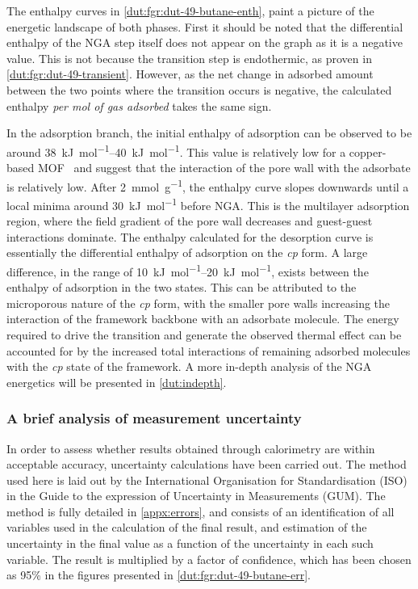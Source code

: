 The enthalpy curves in \autoref{dut:fgr:dut-49-butane-enth},
paint a picture of the energetic landscape of both phases.
First it should be noted that the differential enthalpy of
the NGA step itself does not appear on the graph as it is a
negative value. This is not because the transition step is 
endothermic, as proven in \autoref{dut:fgr:dut-49-transient}. 
However, as the net change in adsorbed amount between the two
points where the transition occurs is negative, the calculated
enthalpy \textit{per mol of gas adsorbed} takes the same sign.

In the adsorption branch, the initial enthalpy of adsorption 
can be observed to be around \SIrange{38}{40}{\kilo\joule\per\mol}.
This value is relatively low for a copper-based 
MOF~\cite{langeStructuralFlexibilityCopperbased2014} and suggest
that the interaction of the pore wall with the adsorbate is 
relatively low. After \SI{2}{\milli\mol\per\gram}, the enthalpy
curve slopes downwards until a local minima around 
\SI{30}{\kilo\joule\per\mol} before NGA. 
This is the multilayer adsorption region,
where the field gradient of the pore wall decreases and guest-guest 
interactions dominate.
The enthalpy calculated for the desorption curve is essentially the 
differential enthalpy of adsorption on the \textit{cp} form. A large 
difference, in the range of \SIrange{10}{20}{\kilo\joule\per\mol}, exists
between the enthalpy of adsorption in the two states. This can be 
attributed to the microporous nature of the \textit{cp} form, with the
smaller pore walls increasing the interaction of the framework backbone
with an adsorbate molecule. The energy required to drive the 
transition and generate the observed thermal effect can be accounted 
for by the increased total interactions of remaining adsorbed 
molecules with the \textit{cp} state of the framework.
A more in-depth analysis of the NGA energetics will be presented 
in \autoref{dut:indepth}.

\subsubsection{A brief analysis of measurement uncertainty}

In order to assess whether results obtained through calorimetry
are within acceptable accuracy, uncertainty calculations have been
carried out. The method used here is laid out by the International 
Organisation for Standardisation (ISO) in the Guide to the expression
of Uncertainty in Measurements (GUM). The method is fully detailed 
in \autoref{appx:errors}, and consists of an identification of 
all variables used in the calculation of the final result, and 
estimation of the uncertainty in the final value as a function of
the uncertainty in each such variable. The result is multiplied
by a factor of confidence, which has been chosen as 95\% in the 
figures presented in \autoref{dut:fgr:dut-49-butane-err}.


